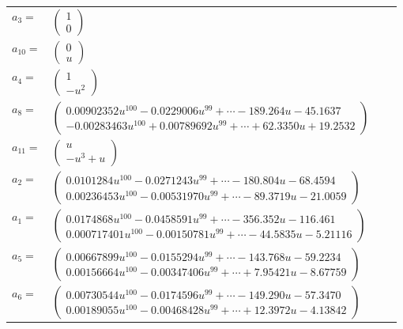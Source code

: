 \documentclass[1p]{elsarticle_modified}
\theoremstyle{definition}
\begin{document}
\begin{tabular}{m{7pt} m{180pt} m{7pt} m{180pt} }
\flushright $a_{3}=$&$\begin{pmatrix}1\\0\end{pmatrix}$ \\
\flushright $a_{10}=$&$\begin{pmatrix}0\\u\end{pmatrix}$ \\
\flushright $a_{4}=$&$\begin{pmatrix}1\\- u^2\end{pmatrix}$ \\
\flushright $a_{8}=$&$\begin{pmatrix}0.00902352 u^{100}-0.0229006 u^{99}+\cdots-189.264 u-45.1637\\-0.00283463 u^{100}+0.00789692 u^{99}+\cdots+62.3350 u+19.2532\end{pmatrix}$ \\
\flushright $a_{11}=$&$\begin{pmatrix}u\\- u^3+u\end{pmatrix}$ \\
\flushright $a_{2}=$&$\begin{pmatrix}0.0101284 u^{100}-0.0271243 u^{99}+\cdots-180.804 u-68.4594\\0.00236453 u^{100}-0.00531970 u^{99}+\cdots-89.3719 u-21.0059\end{pmatrix}$ \\
\flushright $a_{1}=$&$\begin{pmatrix}0.0174868 u^{100}-0.0458591 u^{99}+\cdots-356.352 u-116.461\\0.000717401 u^{100}-0.00150781 u^{99}+\cdots-44.5835 u-5.21116\end{pmatrix}$ \\
\flushright $a_{5}=$&$\begin{pmatrix}0.00667899 u^{100}-0.0155294 u^{99}+\cdots-143.768 u-59.2234\\0.00156664 u^{100}-0.00347406 u^{99}+\cdots+7.95421 u-8.67759\end{pmatrix}$ \\
\flushright $a_{6}=$&$\begin{pmatrix}0.00730544 u^{100}-0.0174596 u^{99}+\cdots-149.290 u-57.3470\\0.00189055 u^{100}-0.00468428 u^{99}+\cdots+12.3972 u-4.13842\end{pmatrix}$ \\

\end{tabular}
\end{document}
